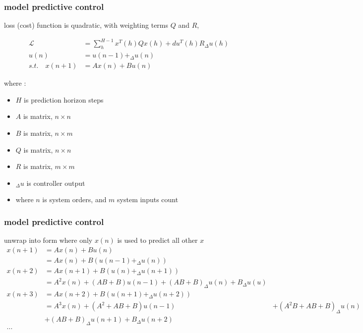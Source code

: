 \documentclass{beamer}
\begin{document}
\begin{frame}
  
  \frametitle{\bf model predictive control}

  loss (cost) function is quadratic, with weighting terms $Q$ and $R$,

  \begin{align*}
    \mathcal{L} &=\sum_h^{H-1} x^T(h) Q x(h) + du^T(h) R _\Delta u(h) \\
    u(n) & = u(n-1) + _\Delta u(n) \\
    s.t. \quad x(n+1) &= Ax(n) + Bu(n) 
  \end{align*}  

  where : 
  \begin{itemize}
    \item $H$ is prediction horizon steps
    \item $A$ is matrix, $n \times n$
    \item $B$ is matrix, $n \times m$
    \item $Q$ is matrix, $n \times n$
    \item $R$ is matrix, $m \times m$
    \item $_\Delta u$ is controller output
    \item where $n$ is system orders, and $m$ system inputs count
  \end{itemize}

  
\end{frame}


\begin{frame}
  
  \frametitle{\bf model predictive control}
  unwrap into form where only $x(n)$ is used to predict all other $x$
  \begin{align*}
    x(n+1)&= Ax(n) + Bu(n) \\
          &= Ax(n) + B(u(n-1) + _\Delta u(n)) \\
    x(n+2)&= Ax(n+1) + B(u(n) + _\Delta u(n+1)) \\
          &= A^2x(n) + (AB + B)u(n-1) + (AB+B)_\Delta u(n) + B_\Delta u(u) \\
    x(n+3)&= Ax(n+2) + B(u(n+1) + _\Delta u(n+2)) \\
          &= A^3x(n) + (A^2 + AB + B)u(n-1) 
          & + (A^2B + AB + B)_\Delta u(n) \\
          & + (AB + B)_\Delta u(n+1) + B_\Delta u(n+2) \\
    ... 
  \end{align*}  

  
\end{frame}
\end{document}
